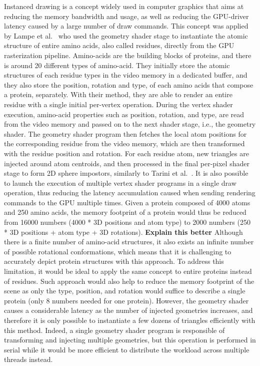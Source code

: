 Instanced drawing is a concept widely used in computer graphics that aims at reducing the memory bandwidth and usage, as well as reducing the GPU-driver latency caused by a large number of draw commands.
This concept was applied by Lampe et al.~\cite{lampe2007two} who used the geometry shader stage to instantiate the atomic structure of entire amino acids, also called residues, directly from the GPU rasterization pipeline.
Amino-acids are the building blocks of proteins, and there is around 20 different types of amino-acid.
They initially store the atomic structures of each residue types in the video memory in a dedicated buffer, and they also store the position, rotation and type, of each amino acids that compose a protein, separately.
With their method, they are able to render an entire residue with a single initial per-vertex operation.
During the vertex shader execution, amino-acid properties such as position, rotation, and type, are read from the video memory and passed on to the next shader stage, i.e., the geometry shader.
The geometry shader program then fetches the local atom positions for the corresponding residue from the video memory, which are then transformed with the residue position and rotation.
For each residue atom, new triangles are injected around atom centroids, and then processed in the final per-pixel shader stage to form 2D sphere impostors, similarly to Tarini et al.~\cite{tarini2006ambient}.
It is also possible to launch the execution of multiple vertex shader programs in a single draw operation, thus reducing the latency accumulation caused when sending rendering commands to the GPU multiple times.
Given a protein composed of 4000 atoms and 250 amino acids, the memory footprint of a protein would thus be reduced from 16000 numbers (4000 * 3D positions and atom type) to 2000 numbers (250 * 3D positions + atom type + 3D rotations).
\textbf{Explain this better}
Although there is a finite number of amino-acid structures, it also exists an infinite number of possible rotational conformations, which means that it is challenging to accurately depict protein structures with this approach.
To address this limitation, it would be ideal to apply the same concept to entire proteins instead of residues.
Such approach would also help to reduce the memory footprint of the scene as only the type, position, and rotation would suffice to describe a single protein (only 8 numbers needed for one protein).
However, the geometry shader causes a considerable latency as the number of injected geometries increases, and therefore it is only possible to instantiate a few dozens of triangles efficiently with this method.
Indeed, a single geometry shader program is responsible of transforming and injecting multiple geometries, but this operation is performed in serial while it would be more efficient to distribute the workload across multiple threads instead.

